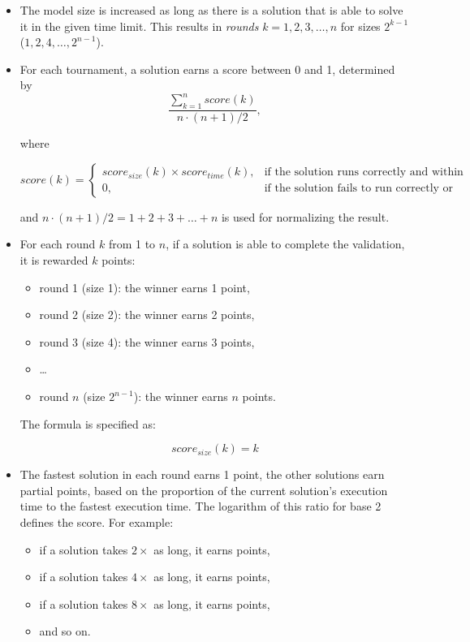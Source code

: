 \documentclass[submission,copyright,creativecommons]{eptcs}
\begin{document}
\begin{itemize}
  \item The model size is increased as long as there is a solution that is able to solve it in the given time limit. This results in \emph{rounds} $k = 1, 2, 3, \ldots, n$ for sizes $2^{k-1}$ ($1, 2, 4, \ldots, 2^{n-1}$).  
  \item For each tournament, a solution earns a score between 0 and 1, determined by
\[\frac{\sum^{\mathit{n}}_{k=1} \mathit{score}(k)}{\mathit{n}\cdot(\mathit{n}+1)/2}, \]

where
 
\[
\mathit{score}(k) =
\begin{cases}
    \mathit{score}_\mathit{size}(k) \times \mathit{score}_\mathit{time}(k), & \text{if the solution runs correctly and within the given time limit,}\\
    0,                                                                      & \text{if the solution fails to run correctly or exceeds the given time limit,}
\end{cases}
\]

and $\mathit{n}\cdot(\mathit{n}+1)/2 = 1 + 2 + 3 + \ldots + n$ is used for normalizing the result.

  \item For each round $\mathit{k}$ from 1 to $n$, if a solution is able to complete the validation, it is rewarded $k$ points:
  	\begin{itemize}
  	  \item round 1 (size 1): the winner earns 1 point,
  	  \item round 2 (size 2): the winner earns 2 points,
  	  \item round 3 (size 4): the winner earns 3 points,
  	  \item \ldots
  	  \item round $n$ (size $2^{n-1}$): the winner earns $n$ points.
  	\end{itemize}
  	
  	The formula is specified as:
  	
    \[ \mathit{score}_\mathit{size}(k)= k \]
  	
  \item The fastest solution in each round earns 1 point, the other solutions earn partial points, based on the proportion of the current solution's execution time to the fastest execution time. The logarithm of this ratio for base 2 defines the score. For example:
  	\begin{itemize}
  	  \item if a solution takes $2 \times$ as long, it earns  points, 
  	  \item if a solution takes $4 \times$ as long, it earns  points,
  	  \item if a solution takes $8 \times$ as long, it earns  points,
  	  \item and so on.
  	\end{itemize}
  	

\end{itemize}
\end{document}
